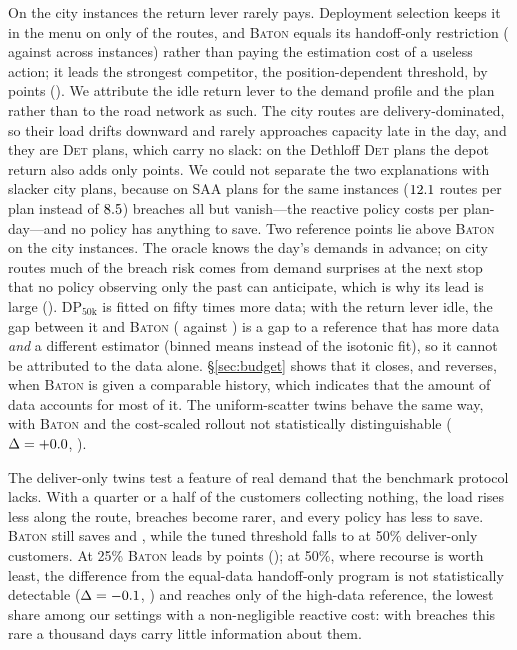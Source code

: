 \documentclass[preprint,authoryear,12pt]{elsarticle}
\theoremstyle{definition}
\theoremstyle{remark}
\begin{document}
On the city instances the return lever rarely pays. Deployment
selection keeps it in the menu on only \cityActShare{} of the routes,
and \textsc{Baton} equals its handoff-only restriction (\svCityBaton{}
against \svCityHo{} across \nCity{} instances) rather than paying the
estimation cost of a useless action; it leads the strongest competitor,
the position-dependent threshold, by \lgCityDelta{} points
(\lgCityDeltaCI). We attribute the idle return lever to the demand
profile and the plan rather than to the road network as such. The city
routes are delivery-dominated, so their load drifts downward and rarely
approaches capacity late in the day, and they are \textsc{Det} plans,
which carry no slack: on the Dethloff \textsc{Det} plans the depot
return also adds only \detActGain{} points. We could not separate the
two explanations with slacker city plans, because on \textsc{SAA} plans
for the same instances ($12.1$ routes per plan instead of
$8.5$) breaches all but vanish---the reactive policy costs
\citySaaReact{} per plan-day---and no policy has anything to save. Two
reference points lie above \textsc{Baton} on the city instances. The
oracle knows the day's demands in advance; on city routes much of the
breach risk comes from demand surprises at the next stop that no policy
observing only the past can anticipate, which is why its lead is large
(\svCityOrc{}). DP$_{50\mathrm{k}}$ is fitted on fifty times more data;
with the return lever idle, the gap between it and \textsc{Baton}
(\svCityDp{} against \svCityBaton{}) is a gap to a reference that has
more data \emph{and} a different estimator (binned means instead of the
isotonic fit), so it cannot be attributed to the data alone.
\S\ref{sec:budget} shows that it closes, and reverses, when
\textsc{Baton} is given a comparable history, which indicates that
the amount of data accounts for most of it. The
uniform-scatter twins behave the same way, with \textsc{Baton} and the
cost-scaled rollout not statistically distinguishable ($\Delta = +0.0$,
\lgCityUDeltaCI).

The deliver-only twins test a feature of real demand that the benchmark
protocol lacks. With a quarter or a half of the customers collecting
nothing, the load rises less along the route, breaches become rarer,
and every policy has less to save. \textsc{Baton} still saves
\svZpTwentyFiveBaton{} and \svZpFiftyBaton{}, while the tuned threshold
falls to \svZpFiftyThr{} at 50\% deliver-only customers. At 25\%
\textsc{Baton} leads by \lgZpTwentyFiveDelta{} points
(\lgZpTwentyFiveDeltaCI); at 50\%, where recourse is worth least, the
difference from the equal-data handoff-only program is not statistically
detectable ($\Delta =
-0.1$, \lgZpFiftyDeltaCI) and reaches only \lgZpFiftyRatio{}
of the high-data reference, the lowest share among our settings with a
non-negligible reactive cost: with breaches
this rare a thousand days carry little information about them.
\end{document}
